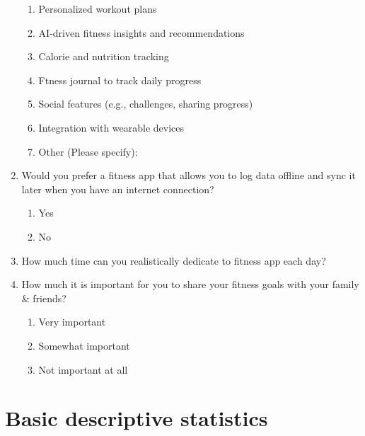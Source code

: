 \documentclass[letterpaper,11pt]{texMemo} %
\begin{document}
\begin{enumerate}
\begin{enumerate}
\item Personalized workout plans
\item AI-driven fitness insights and recommendations
\item Calorie and nutrition tracking
\item Ftness journal to track daily progress
\item  Social features (e.g., challenges, sharing progress)
\item Integration with wearable devices
\item Other (Please specify): 

\end{enumerate}


\item Would you prefer a fitness app that allows you to log data offline and sync it later when you have an internet connection?

\begin{enumerate}
	\item Yes
	\item No
\end{enumerate}
\item How much time can you realistically dedicate to fitness app each day?

\item How much it is important for you to share your fitness goals with your family \& friends?

\begin{enumerate}
	\item Very important
	\item Somewhat important
	\item Not important at all
\end{enumerate}
\end{enumerate}

\section{Basic descriptive statistics}
\end{document}
